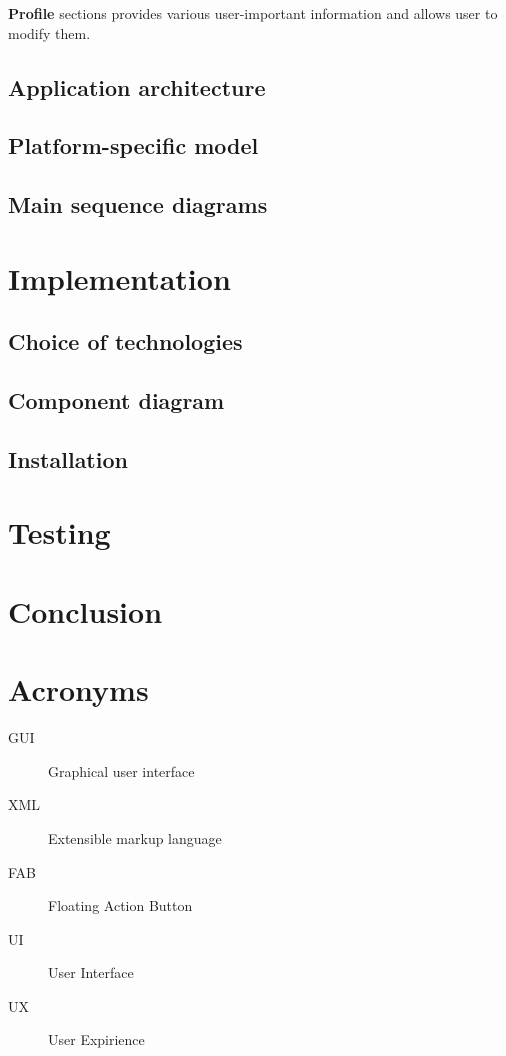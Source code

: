 \documentclass[thesis=B,english]{FITthesis}[2012/10/20]
\begin{document}
\textbf{Profile} sections provides various user-important information and allows user to modify them.

\section{Application architecture}
\section{Platform-specific model}
\section{Main sequence diagrams}

\chapter{Implementation}
\section{Choice of technologies}
\section{Component diagram}
\section{Installation}

\cite{WEBSITE:1}
\chapter{Testing}


\chapter{Conclusion}






\appendix

\chapter{Acronyms}
\begin{description}
	\item[GUI] Graphical user interface
	\item[XML] Extensible markup language
	\item[FAB] Floating Action Button
	\item[UI] User Interface
	\item[UX] User Expirience
\end{description}
\end{document}
